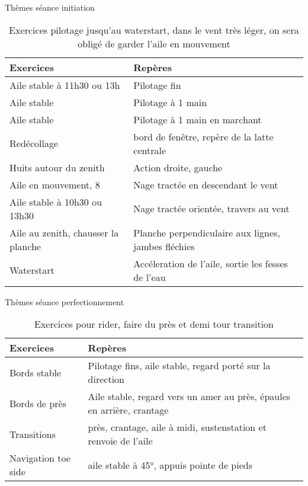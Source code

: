 \documentclass[10pt,a4paper]{beamer}
\begin{document}
\begin{frame}{Thèmes séance initiation}
\begin{table}
\begin{tabular}{|p{4cm}|p{6cm}|}
\hline
\textbf{Exercices}     &  \textbf{Repères}      \\
\hline 
Aile stable à 11h30 ou 13h & Pilotage fin  \\
\hline
Aile stable               & Pilotage à 1 main \\
\hline 
Aile stable               & Pilotage à 1 main en marchant \\
\hline 
Redécollage            & bord de fen\^etre, repère de la latte centrale \\
\hline
Huits autour du zenith & Action droite, gauche  \\
\hline
Aile en mouvement, 8      & Nage tractée en descendant le vent \\
\hline 
Aile stable à 10h30 ou 13h30   	& Nage tractée orientée, travers au vent \\
\hline
Aile au zenith, chausser la planche  & Planche perpendiculaire aux lignes, jambes fléchies \\
\hline
Waterstart                           &  Accéleration de l'aile, sortie les fesses de l'eau \\
\hline
\end{tabular}
\caption{Exercices pilotage jusqu'au waterstart, dans le vent très léger, on sera obligé de garder l'aile en mouvement}

\end{table}
\end{frame}
\begin{frame}{Thèmes séance perfectionnement}
\begin{table}
\begin{tabular}{|p{2cm}|p{8cm}|}
\hline
\textbf{Exercices}     &  \textbf{Repères}      \\
\hline 
Bords stable & Pilotage fins, aile stable, regard porté sur la direction   \\
\hline
Bords de près  & Aile stable, regard vers un amer au près, épaules en arrière, crantage  \\
\hline 
Transitions & près, crantage, aile à midi, sustenstation et renvoie de l'aile \\
\hline
Navigation toe side   &  aile stable à 45°, appuis pointe de pieds   \\
\hline
\end{tabular}
\caption{Exercices pour rider, faire du près et demi tour transition}
\end{table}
\end{frame}
\end{document}
